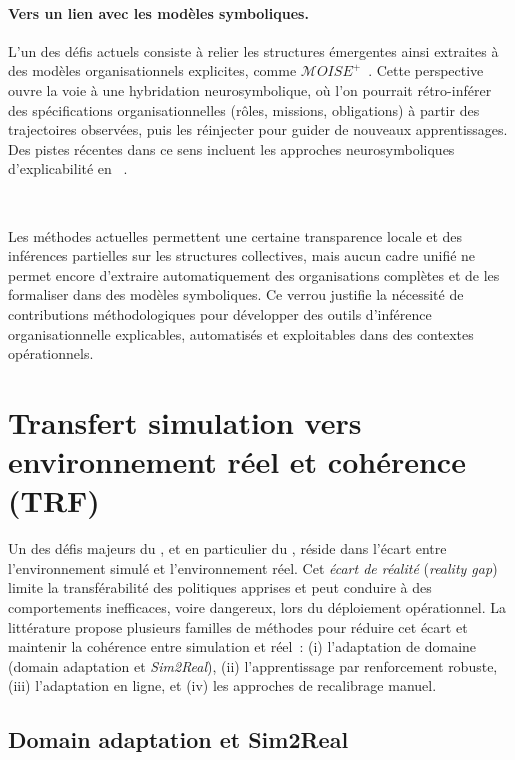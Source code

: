 \paragraph{Vers un lien avec les modèles symboliques.}
L'un des défis actuels consiste à relier les structures émergentes
ainsi extraites à des modèles organisationnels explicites,
comme $\mathcal{M}OISE^+$~\cite{hubner2007using}.
Cette perspective ouvre la voie à une hybridation neurosymbolique,
où l'on pourrait rétro-inférer des spécifications organisationnelles
(rôles, missions, obligations) à partir des trajectoires observées,
puis les réinjecter pour guider de nouveaux apprentissages.
Des pistes récentes dans ce sens incluent les approches neurosymboliques
d'explicabilité en ~\cite{subramanian2024neurosymbolic}.

\

Les méthodes actuelles permettent une certaine transparence locale
et des inférences partielles sur les structures collectives,
mais aucun cadre unifié ne permet encore
d'extraire automatiquement des organisations complètes
et de les formaliser dans des modèles symboliques.
Ce verrou justifie la nécessité de contributions méthodologiques
pour développer des outils d'inférence organisationnelle
explicables, automatisés et exploitables dans des contextes opérationnels.

\section{Transfert simulation vers environnement réel et cohérence (TRF)}

\noindent
Un des défis majeurs du , et en particulier du , réside dans l'écart
entre l'environnement simulé et l'environnement réel. Cet \textit{écart de réalité}
(\textit{reality gap}) limite la transférabilité des politiques apprises et
peut conduire à des comportements inefficaces, voire dangereux,
lors du déploiement opérationnel. La littérature propose plusieurs familles de méthodes
pour réduire cet écart et maintenir la cohérence entre simulation et réel~:
(i) l'adaptation de domaine (domain adaptation et \textit{Sim2Real}),
(ii) l'apprentissage par renforcement robuste,
(iii) l'adaptation en ligne, et
(iv) les approches de recalibrage manuel.

\subsection{Domain adaptation et Sim2Real}

